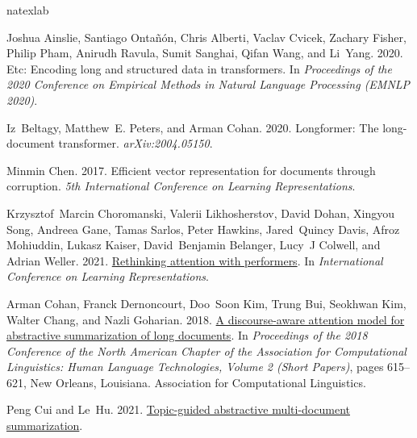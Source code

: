 \documentclass[11pt]{article}
\begin{document}
\begin{thebibliography}{43}
\expandafter\ifx\csname natexlab\endcsname\relax\def\natexlab#1{#1}\fi

Joshua Ainslie, Santiago Onta{\~n}{\'o}n, Chris Alberti, Vaclav Cvicek, Zachary
  Fisher, Philip Pham, Anirudh Ravula, Sumit Sanghai, Qifan Wang, and Li~Yang.
  2020.
\newblock Etc: Encoding long and structured data in transformers.
\newblock In \emph{Proceedings of the 2020 Conference on Empirical Methods in
  Natural Language Processing (EMNLP 2020)}.

Iz~Beltagy, Matthew~E. Peters, and Arman Cohan. 2020.
\newblock Longformer: The long-document transformer.
\newblock \emph{arXiv:2004.05150}.

Minmin Chen. 2017.
\newblock Efficient vector representation for documents through corruption.
\newblock \emph{5th International Conference on Learning Representations}.

Krzysztof~Marcin Choromanski, Valerii Likhosherstov, David Dohan, Xingyou Song,
  Andreea Gane, Tamas Sarlos, Peter Hawkins, Jared~Quincy Davis, Afroz
  Mohiuddin, Lukasz Kaiser, David~Benjamin Belanger, Lucy~J Colwell, and Adrian
  Weller. 2021.
\newblock \href {https://openreview.net/forum?id=Ua6zuk0WRH} {Rethinking
  attention with performers}.
\newblock In \emph{International Conference on Learning Representations}.

Arman Cohan, Franck Dernoncourt, Doo~Soon Kim, Trung Bui, Seokhwan Kim, Walter
  Chang, and Nazli Goharian. 2018.
\newblock \href {https://doi.org/10.18653/v1/N18-2097} {A discourse-aware
  attention model for abstractive summarization of long documents}.
\newblock In \emph{Proceedings of the 2018 Conference of the North {A}merican
  Chapter of the Association for Computational Linguistics: Human Language
  Technologies, Volume 2 (Short Papers)}, pages 615--621, New Orleans,
  Louisiana. Association for Computational Linguistics.

Peng Cui and Le~Hu. 2021.
\newblock \href {http://arxiv.org/abs/2110.11207} {Topic-guided abstractive
  multi-document summarization}.


\end{thebibliography}
\end{document}
